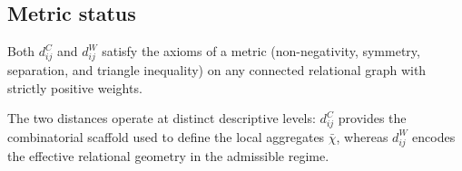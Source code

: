 \subsection{Metric status}
  \label{subsec:metric-status}

  Both $d_{ij}^{C}$ and $d_{ij}^{W}$ satisfy the axioms of a metric
  (non-negativity, symmetry, separation, and triangle inequality)
  on any connected relational graph with strictly positive weights.

  The two distances operate at distinct descriptive levels:
  $d_{ij}^{C}$ provides the combinatorial scaffold used to define
  the local aggregates $\bar{\chi}$, whereas $d_{ij}^{W}$ encodes
  the effective relational geometry in the admissible regime.
